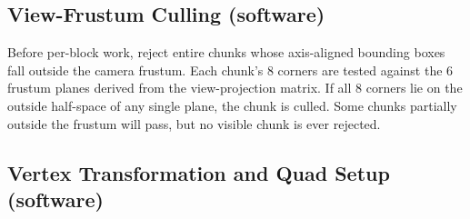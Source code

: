 \documentclass[11pt]{article}
\begin{document}
\subsection{View-Frustum Culling (software)}

Before per-block work, reject entire chunks whose axis-aligned bounding boxes fall outside the camera frustum. Each chunk's 8 corners are tested against the 6 frustum planes derived from the view-projection matrix. If all 8 corners lie on the outside half-space of any single plane, the chunk is culled. Some chunks partially outside the frustum will pass, but no visible chunk is ever rejected.

\subsection{Vertex Transformation and Quad Setup (software)}
\label{sec:geom}
\end{document}
